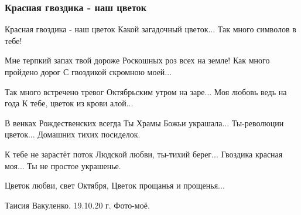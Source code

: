  
 
 

\subsubsection{Красная гвоздика - наш цветок}

Красная гвоздика - наш цветок
Какой загадочный цветок...
Так много символов в тебе!

Мне терпкий запах твой дороже
Роскошных роз всех на земле!
Как много пройдено дорог
С гвоздикой скромною моей...

Так много встречено тревог
Октябрьским утром на заре...
Моя любовь ведь на года
К тебе, цветок из крови алой...

В венках Рождественских всегда
Ты Храмы Божьи украшала...
Ты-революции цветок...
Домашних тихих посиделок.

К тебе не зарастёт поток
Людской любви, ты-тихий берег...
Гвоздика красная моя...
Ты не простое украшенье.

Цветок любви, свет Октября,
Цветок прощанья и прощенья...

Таисия Вакуленко. 
19.10.20 г.
Фото-моё.
